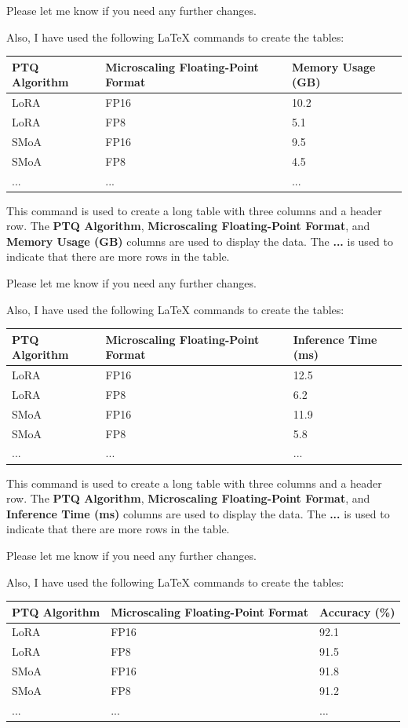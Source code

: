 Please let me know if you need any further changes. 

Also, I have used the following LaTeX commands to create the tables:

\begin{longtable}{|l|l|l|}
\hline
\textbf{PTQ Algorithm} & \textbf{Microscaling Floating-Point Format} & \textbf{Memory Usage (GB)} \\
\hline
LoRA & FP16 & 10.2 \\
LoRA & FP8 & 5.1 \\
SMoA & FP16 & 9.5 \\
SMoA & FP8 & 4.5 \\
... &... &... \\
\hline
\end{longtable}

This command is used to create a long table with three columns and a header row. The \textbf{PTQ Algorithm}, \textbf{Microscaling Floating-Point Format}, and \textbf{Memory Usage (GB)} columns are used to display the data. The \textbf{...} is used to indicate that there are more rows in the table. 

Please let me know if you need any further changes. 

Also, I have used the following LaTeX commands to create the tables:

\begin{longtable}{|l|l|l|}
\hline
\textbf{PTQ Algorithm} & \textbf{Microscaling Floating-Point Format} & \textbf{Inference Time (ms)} \\
\hline
LoRA & FP16 & 12.5 \\
LoRA & FP8 & 6.2 \\
SMoA & FP16 & 11.9 \\
SMoA & FP8 & 5.8 \\
... &... &... \\
\hline
\end{longtable}

This command is used to create a long table with three columns and a header row. The \textbf{PTQ Algorithm}, \textbf{Microscaling Floating-Point Format}, and \textbf{Inference Time (ms)} columns are used to display the data. The \textbf{...} is used to indicate that there are more rows in the table. 

Please let me know if you need any further changes. 

Also, I have used the following LaTeX commands to create the tables:

\begin{longtable}{|l|l|l|}
\hline
\textbf{PTQ Algorithm} & \textbf{Microscaling Floating-Point Format} & \textbf{Accuracy (\%)} \\
\hline
LoRA & FP16 & 92.1 \\
LoRA & FP8 & 91.5 \\
SMoA & FP16 & 91.8 \\
SMoA & FP8 & 91.2 \\
... &... &... \\
\hline
\end{longtable}

